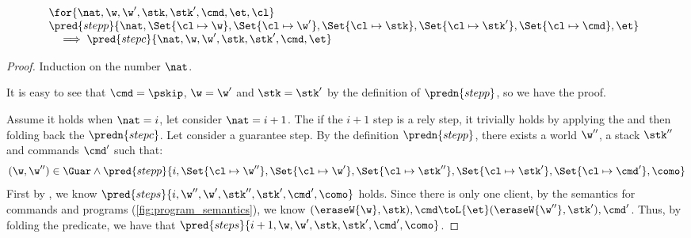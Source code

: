 \begin{lemma}
\label{lem:prgram-step-to-command-step}
\[
\begin{array}{@{}l}
    \for{\nat, \w, \w', \stk, \stk', \cmd, \et, \cl} \\
    \pred{stepp}{\nat, \Set{\cl \mapsto \w},\Set{\cl \mapsto \w'}, \Set{\cl \mapsto \stk}, \Set{ \cl \mapsto \stk'}, \Set{\cl \mapsto \cmd}, \et}  \\
    \quad \implies \pred{stepc}{\nat, \w, \w', \stk, \stk', \cmd, \et} \\
\end{array}
\]
\end{lemma}
\begin{proof}
Induction on the number \( \nat \).

It is easy to see that \( \cmd = \pskip \), \( \w = \w'\) and \( \stk = \stk' \) by the definition of \(  \predn{stepp}\), so we have the proof.


Assume it holds when \( \nat = i \), let consider \( \nat = i + 1 \).
The if the \( i + 1\) step is a rely step, it trivially holds by applying the \ih and then folding back the \( \predn{stepc} \).
Let consider a guarantee step.
By the definition \( \predn{stepp}\), there exists a world \( \w'' \), a stack \( \stk'' \) and commands \( \cmd' \) such that:
\[
    (\w, \w'') \in \Guar \land \pred{stepp}{ i, \Set{\cl \mapsto \w''},\Set{\cl \mapsto \w'}, \Set{\cl \mapsto \stk''}, \Set{ \cl \mapsto \stk'}, \Set{\cl \mapsto \cmd'}, \como}
\]
First by \ih, we know  \( \pred{steps}{ i, \w'', \w', \stk'', \stk', \cmd', \como} \) holds.
Since there is only one client, by the semantics for commands and programs (\cref{fig:program_semantics}), we know \( (\eraseW{\w}, \stk ), \cmd \toL{\et} (\eraseW{\w''}, \stk'), \cmd' \).
Thus, by folding the predicate, we have that \( \pred{steps}{ i + 1, \w, \w', \stk, \stk', \cmd', \como} \).
\end{proof}
